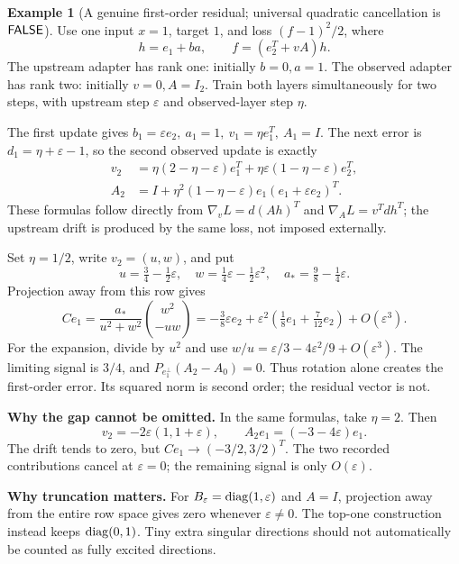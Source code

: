 \documentclass[12pt,a4paper]{article}
\theoremstyle{readable}
\theoremstyle{definition}\newtheorem{example}[theorem]{Example}
\begin{document}
\begin{example}[A genuine first-order residual; universal quadratic cancellation is \(\mathsf{FALSE}\)]\label{ex:first}
Use one input \(x=1\), target \(1\), and loss \((f-1)^2/2\), where
\[
h=e_1+ba,\qquad f=(e_2^T+vA)h.
\]
The upstream adapter has rank one: initially \(b=0,a=1\). The observed adapter has rank two: initially \(v=0,A=I_2\). Train both layers simultaneously for two steps, with upstream step \(\varepsilon\) and observed-layer step \(\eta\).

The first update gives
\(b_1=\varepsilon e_2,\ a_1=1,\ v_1=\eta e_1^T,\ A_1=I\).
The next error is \(d_1=\eta+\varepsilon-1\), so the second observed update is exactly
\begin{align*}
v_2&=\eta(2-\eta-\varepsilon)e_1^T
+\eta\varepsilon(1-\eta-\varepsilon)e_2^T,\\
A_2&=I+\eta^2(1-\eta-\varepsilon)e_1(e_1+\varepsilon e_2)^T.
\end{align*}
These formulas follow directly from \(\nabla_vL=d(Ah)^T\) and \(\nabla_AL=v^Tdh^T\); the upstream drift is produced by the same loss, not imposed externally.

Set \(\eta=1/2\), write \(v_2=(u,w)\), and put
\[
u=\tfrac34-\tfrac12\varepsilon,\quad
w=\tfrac14\varepsilon-\tfrac12\varepsilon^2,\quad
a_*=\tfrac98-\tfrac14\varepsilon.
\]
Projection away from this row gives
\[
Ce_1=\frac{a_*}{u^2+w^2}\binom{w^2}{-uw}
=-\tfrac38\varepsilon e_2
+\varepsilon^2\left(\tfrac18e_1+\tfrac7{12}e_2\right)+O(\varepsilon^3).
\]
For the expansion, divide by \(u^2\) and use
\(w/u=\varepsilon/3-4\varepsilon^2/9+O(\varepsilon^3)\).
The limiting signal is \(3/4\), and \(P_{e_1^\perp}(A_2-A_0)=0\). Thus rotation alone creates the first-order error. Its squared norm is second order; the residual vector is not.
\end{example}

\textbf{Why the gap cannot be omitted.} In the same formulas, take \(\eta=2\). Then
\[
v_2=-2\varepsilon(1,1+\varepsilon),\qquad
A_2e_1=(-3-4\varepsilon)e_1.
\]
The drift tends to zero, but \(Ce_1\to(-3/2,3/2)^T\). The two recorded contributions cancel at \(\varepsilon=0\); the remaining signal is only \(O(\varepsilon)\).

\textbf{Why truncation matters.} For \(B_\varepsilon=\operatorname{diag}(1,\varepsilon)\) and \(A=I\), projection away from the entire row space gives zero whenever \(\varepsilon\ne0\). The top-one construction instead keeps \(\operatorname{diag}(0,1)\). Tiny extra singular directions should not automatically be counted as fully excited directions.
\end{document}
